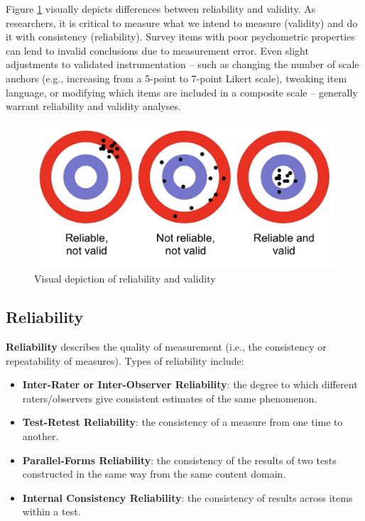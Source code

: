 \documentclass[
]{book}
\providecommand{\tightlist}{%
  \setlength{\itemsep}{0pt}\setlength{\parskip}{0pt}}
\begin{document}
Figure \ref{fig:reli-vali} visually depicts differences between reliability and validity. As researchers, it is critical to measure what we intend to measure (validity) and do it with consistency (reliability). Survey items with poor psychometric properties can lend to invalid conclusions due to measurement error. Even slight adjustments to validated instrumentation -- such as changing the number of scale anchors (e.g., increasing from a 5-point to 7-point Likert scale), tweaking item language, or modifying which items are included in a composite scale -- generally warrant reliability and validity analyses.

\begin{figure}

{\centering \includegraphics[width=0.75\linewidth]{graphics/reliability_validity} 

}

\caption{Visual depiction of reliability and validity}\label{fig:reli-vali}
\end{figure}

\hypertarget{reliability}{%
\subsection{Reliability}\label{reliability}}

\textbf{Reliability} describes the quality of measurement (i.e., the consistency or repeatability of measures). Types of reliability include:

\begin{itemize}
\tightlist
\item
  \textbf{Inter-Rater or Inter-Observer Reliability}: the degree to which different raters/observers give consistent estimates of the same phenomenon.
\item
  \textbf{Test-Retest Reliability}: the consistency of a measure from one time to another.
\item
  \textbf{Parallel-Forms Reliability}: the consistency of the results of two tests constructed in the same way from the same content domain.
\item
  \textbf{Internal Consistency Reliability}: the consistency of results across items within a test.
\end{itemize}
\end{document}
